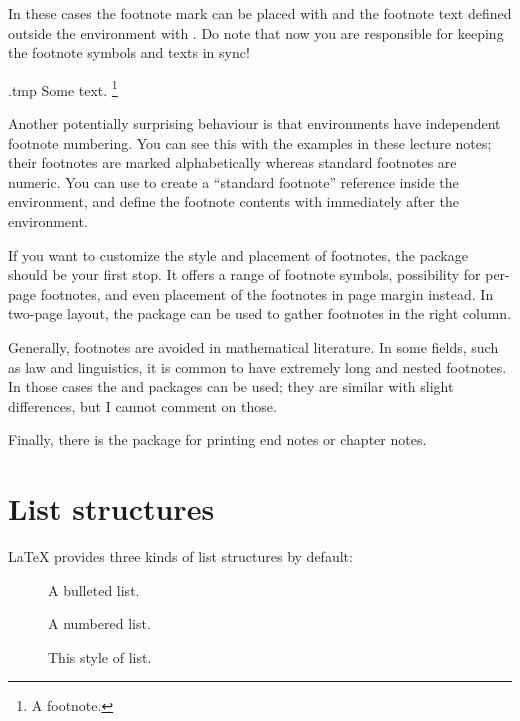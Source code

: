 In these cases the footnote mark can be placed with 
and the footnote text defined outside the environment with .
Do note that now you are responsible for keeping the footnote symbols and texts in sync!
%
\begin{VerbatimOut}{\jobname.tmp}
\renewcommand{\footnotemark}{\mpfootnotemark} %
Some text.%
\footnote{A footnote.\footnotemark}
\end{VerbatimOut}
\ShowExample[2]

Another potentially surprising behaviour is that  environments
have independent footnote numbering.
You can see this with the examples in these lecture notes;
their footnotes are marked alphabetically whereas standard footnotes are numeric.
You can use  to create a ``standard footnote'' reference inside the environment,
and define the footnote contents with  immediately after the environment.

If you want to customize the style and placement of footnotes,
the  package should be your first stop.
It offers a range of footnote symbols, possibility for per-page footnotes,
and even placement of the footnotes in page margin instead.
In two-page layout, the  package can be used to gather
footnotes in the right column.

Generally, footnotes are avoided in mathematical literature.
In some fields, such as law and linguistics,
it is common to have extremely long and nested footnotes.
In those cases the  and  packages can be used;
they are similar with slight differences, but I cannot comment on those.

Finally, there is the  package for printing end notes or chapter notes.


%
%
%
\section{List structures}\label{sec:lists}

\LaTeX{} provides three kinds of list structures by default:
\begin{description}
\item[] A bulleted list.
\item[] A numbered list.
\item[] This style of list.
\end{description}

